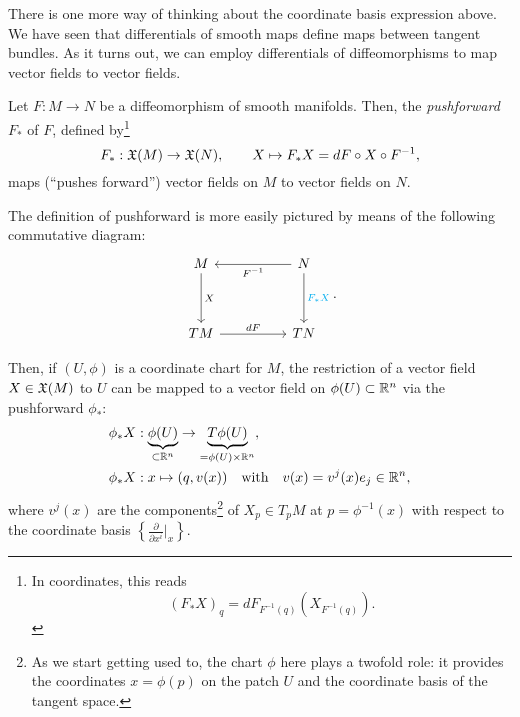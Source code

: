 There is one more way of thinking about the coordinate basis expression above.
We have seen that differentials of smooth maps define maps between tangent bundles.
As it turns out, we can employ differentials of diffeomorphisms to map vector fields to vector fields.

\begin{definition}
  Let $F:M\to N$ be a diffeomorphism of smooth manifolds.
  Then, the \emph{pushforward} $F_*$ of $F$, defined by\footnote{In coordinates, this reads\begin{equation}
      (F_* X)_q = dF_{F^{-1}(q)}(X_{F^{-1}(q)}).
    \end{equation}}
  \begin{equation}\label{eq:pfvf}
    F_*: \mathfrak{X}(M) \to \mathfrak{X}(N),\qquad
    X \mapsto F_* X = d F \circ X \circ F^{-1},
  \end{equation}
  maps (``pushes forward'') vector fields on $M$ to vector fields on $N$.
\end{definition}

The definition of pushforward is more easily pictured by means of the following commutative diagram:
\begin{equation}
  \begin{tikzcd}[row sep=huge, column sep=huge]
    M \arrow[d, "X"]
    & N \arrow[l, "F^{-1}"] \arrow[d, "F_*X" cyan]\\
    TM \arrow[r, "d F"]
    & TN
  \end{tikzcd}.
\end{equation}

Then, if $(U, \phi)$ is a coordinate chart for $M$, the restriction of a vector field $X\in\mathfrak{X}(M)$ to $U$ can be mapped to a vector field on $\phi(U)\subset\mathbb{R}^n$ via the pushforward $\phi_*$:
\begin{align}
  \phi_* X & : \LaTeXunderbrace{\phi(U)}_{\subset\R^n} \to \LaTeXunderbrace{T \phi(U)}_{=\phi(U)\times\R^n}, \\
  \phi_* X & : x\mapsto (q,v(x)) \quad\mbox{with}\quad v(x) = v^j(x)e_j \in \R^n,
\end{align}
where $v^j(x)$ are the components\footnote{As we start getting used to, the chart $\phi$ here plays a twofold role: it provides the coordinates $x=\phi(p)$ on the patch $U$ and the coordinate basis of the tangent space.} of $X_p\in T_p M$ at $p=\phi^{-1}(x)$ with respect to the coordinate basis $\left\{\frac{\partial}{\partial x^i}\big|_x\right\}$.


